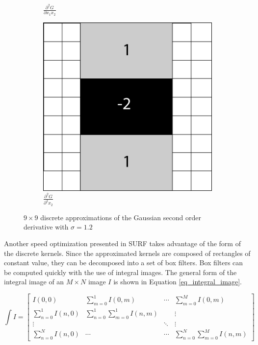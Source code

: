 \documentclass{article}
\begin{document}
\begin{figure}[h]
\begin{subfigure}[b]{0.3\textwidth}
		\caption{$\frac{\partial^2 G}{\partial x_1 x_2}$}
	\end{subfigure}
	\begin{subfigure}[b]{0.3\textwidth}
		\centering
		\includegraphics[width=\textwidth]{figures/hessian/gaussian_second_order_kernel_yy}
		\caption{$\frac{\partial^2 G}{\partial^2 x_2}$}
	\end{subfigure}
	\caption{$9 \times 9$ discrete approximations of the Gaussian second order derivative with $\sigma=1.2$}
	\label{fig_gaussian_kernels}
\end{figure}

Another speed optimization presented in SURF takes advantage of the form of the discrete kernels. Since the approximated kernels are composed of rectangles of constant value, they can be decomposed into a set of box filters. Box filters can be computed quickly with the use of integral images. The general form of the integral image of an $M \times N$ image $I$ is shown in Equation \ref{eq_integral_image}.

\begin{equation}
\int I = \begin{bmatrix}
I(0,0) & \sum\limits_{m=0}^1 I(0,m) & \cdots & \sum\limits_{m=0}^M I(0,m) \\
\sum\limits_{n=0}^1 I(n,0) & \sum\limits_{n=0}^1 \sum\limits_{m=0}^1 I(n,m) & & \vdots \\
\vdots & & \ddots & \vdots \\
\sum\limits_{n=0}^N I(n,0) & \cdots & \cdots & \sum\limits_{n=0}^N \sum\limits_{m=0}^M I(n,m)
\end{bmatrix}
\label{eq_integral_image}
\end{equation}
\end{document}
